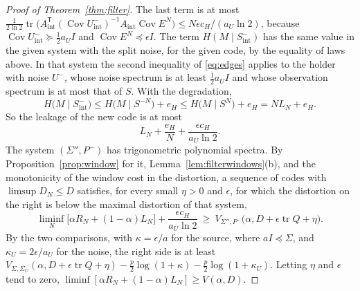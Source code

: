 \documentclass[11pt,onecolumn]{IEEEtran}
\newcommand{\tr}{\operatorname{tr}}
\newcommand{\Cov}{\operatorname{Cov}}
\begin{document}
\begin{proof}[Proof of Theorem~\ref{thm:filter}]
The last term is at most
$\tfrac1{2\ln2}\tr\bigl(A_{\mathrm{int}}^{\mathsf T}(\Cov U^-_{\mathrm{int}})^{-1}A_{\mathrm{int}}\Cov E^N\bigr)\le N\epsilon c_H/(a_U\ln2)$,
because $\Cov U^-_{\mathrm{int}}\succeq\tfrac12a_UI$ and
$\Cov E^N\preceq\epsilon I$. The term $H(M\mid S^-_{\mathrm{int}})$ has
the same value in the given system with the split noise, for the given
code, by the equality of laws above. In that system the second
inequality of \eqref{eq:edges} applies to the holder with noise $U^-$,
whose noise spectrum is at least $\tfrac12a_UI$ and whose observation
spectrum is at most that of $S$. With the degradation,
\begin{equation}
H\bigl(M\mid S^-_{\mathrm{int}}\bigr)\le H\bigl(M\mid S^{-N}\bigr)+e_H\le H\bigl(M\mid S^N\bigr)+e_H=NL_N+e_H .
\label{eq:convchain2}
\end{equation}
So the leakage of the new code is at most
\[
L_N+\frac{e_H}N+\frac{\epsilon c_H}{a_U\ln2}.
\]
The system $(\Sigma'',P^-)$ has trigonometric polynomial spectra. By
Proposition~\ref{prop:window} for it,
Lemma~\ref{lem:filterwindows}(b), and the monotonicity of the window
cost in the distortion, a sequence of codes with $\limsup D_N\le D$
satisfies, for every small $\eta>0$ and $\epsilon$, for which the
distortion on the right is below the maximal distortion of that
system,
\[
\liminf_N\bigl[\alpha R_N+(1-\alpha)L_N\bigr]+\frac{\epsilon c_H}{a_U\ln2}\ \ge\ V_{\Sigma'',P^-}\bigl(\alpha,D+\epsilon\tr Q+\eta\bigr).
\]
By the two comparisons, with $\kappa=\epsilon/a$ for the source, where
$aI\preceq\Sigma$, and $\kappa_U=2\epsilon/a_U$ for the noise, the right
side is at least
$V_{\Sigma,\Sigma_U}(\alpha,D+\epsilon\tr Q+\eta)-\tfrac p2\log(1+\kappa)-\tfrac p2\log(1+\kappa_U)$.
Letting $\eta$ and $\epsilon$ tend to zero,
$\liminf[\alpha R_N+(1-\alpha)L_N]\ge V(\alpha,D)$.


\end{proof}
\end{document}
